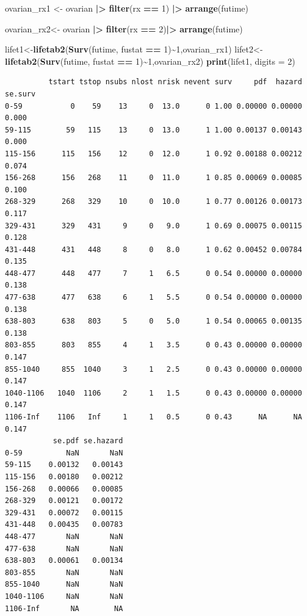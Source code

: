 \documentclass[
]{article}
\newenvironment{Shaded}{\begin{snugshade}}{\end{snugshade}}
\newcommand{\AttributeTok}[1]{\textcolor[rgb]{0.13,0.29,0.53}{#1}}
\newcommand{\DecValTok}[1]{\textcolor[rgb]{0.00,0.00,0.81}{#1}}
\newcommand{\FunctionTok}[1]{\textcolor[rgb]{0.13,0.29,0.53}{\textbf{#1}}}
\newcommand{\NormalTok}[1]{#1}
\newcommand{\OtherTok}[1]{\textcolor[rgb]{0.56,0.35,0.01}{#1}}
\newcommand{\SpecialCharTok}[1]{\textcolor[rgb]{0.81,0.36,0.00}{\textbf{#1}}}
\begin{document}
\begin{Shaded}
\begin{Highlighting}[]
\NormalTok{ovarian\_rx1 }\OtherTok{\textless{}{-}}\NormalTok{ ovarian }\SpecialCharTok{|\textgreater{}}
  \FunctionTok{filter}\NormalTok{(rx }\SpecialCharTok{==} \DecValTok{1}\NormalTok{) }\SpecialCharTok{|\textgreater{}}
  \FunctionTok{arrange}\NormalTok{(futime)}

\NormalTok{ovarian\_rx2}\OtherTok{\textless{}{-}}\NormalTok{ ovarian }\SpecialCharTok{|\textgreater{}}
  \FunctionTok{filter}\NormalTok{(rx }\SpecialCharTok{==} \DecValTok{2}\NormalTok{)}\SpecialCharTok{|\textgreater{}}
  \FunctionTok{arrange}\NormalTok{(futime)}

\NormalTok{lifet1}\OtherTok{\textless{}{-}}\FunctionTok{lifetab2}\NormalTok{(}\FunctionTok{Surv}\NormalTok{(futime, fustat }\SpecialCharTok{==} \DecValTok{1}\NormalTok{)}\SpecialCharTok{\textasciitilde{}}\DecValTok{1}\NormalTok{,ovarian\_rx1)}
\NormalTok{lifet2}\OtherTok{\textless{}{-}}\FunctionTok{lifetab2}\NormalTok{(}\FunctionTok{Surv}\NormalTok{(futime, fustat }\SpecialCharTok{==} \DecValTok{1}\NormalTok{)}\SpecialCharTok{\textasciitilde{}}\DecValTok{1}\NormalTok{,ovarian\_rx2)}
\FunctionTok{print}\NormalTok{(lifet1, }\AttributeTok{digits =} \DecValTok{2}\NormalTok{)}
\end{Highlighting}
\end{Shaded}

\begin{verbatim}
          tstart tstop nsubs nlost nrisk nevent surv     pdf  hazard se.surv
0-59           0    59    13     0  13.0      0 1.00 0.00000 0.00000   0.000
59-115        59   115    13     0  13.0      1 1.00 0.00137 0.00143   0.000
115-156      115   156    12     0  12.0      1 0.92 0.00188 0.00212   0.074
156-268      156   268    11     0  11.0      1 0.85 0.00069 0.00085   0.100
268-329      268   329    10     0  10.0      1 0.77 0.00126 0.00173   0.117
329-431      329   431     9     0   9.0      1 0.69 0.00075 0.00115   0.128
431-448      431   448     8     0   8.0      1 0.62 0.00452 0.00784   0.135
448-477      448   477     7     1   6.5      0 0.54 0.00000 0.00000   0.138
477-638      477   638     6     1   5.5      0 0.54 0.00000 0.00000   0.138
638-803      638   803     5     0   5.0      1 0.54 0.00065 0.00135   0.138
803-855      803   855     4     1   3.5      0 0.43 0.00000 0.00000   0.147
855-1040     855  1040     3     1   2.5      0 0.43 0.00000 0.00000   0.147
1040-1106   1040  1106     2     1   1.5      0 0.43 0.00000 0.00000   0.147
1106-Inf    1106   Inf     1     1   0.5      0 0.43      NA      NA   0.147
           se.pdf se.hazard
0-59          NaN       NaN
59-115    0.00132   0.00143
115-156   0.00180   0.00212
156-268   0.00066   0.00085
268-329   0.00121   0.00172
329-431   0.00072   0.00115
431-448   0.00435   0.00783
448-477       NaN       NaN
477-638       NaN       NaN
638-803   0.00061   0.00134
803-855       NaN       NaN
855-1040      NaN       NaN
1040-1106     NaN       NaN
1106-Inf       NA        NA
\end{verbatim}
\end{document}
